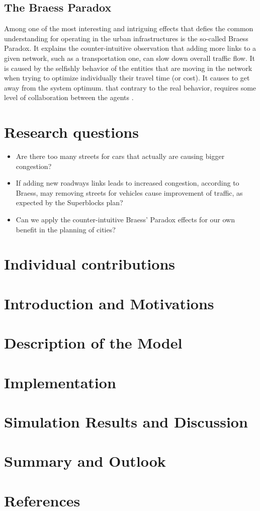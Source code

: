\documentclass[11pt]{article}
\begin{document}
\subsection {The Braess Paradox}

Among one of the most interesting and intriguing effects that defies the common understanding for operating in the urban infrastructures is the so-called Braess Paradox. It explains the counter-intuitive observation that adding more links to a given network, such as a transportation one, can slow down overall traffic flow. It is caused by the selfishly behavior of the entities that are moving in the network when trying to optimize individually their travel time (or cost). It causes to get away from the system optimum. that contrary to the real behavior, requires some level of collaboration between the agents \citep{Braess1969}.

\section {Research questions}

\begin{itemize}
    \item Are there too many streets for cars that actually are causing bigger congestion?
    \item If adding new roadways links leads to increased congestion, according to Braess, may removing streets for vehicles cause improvement of traffic, as expected by the Superblocks plan?
    \item Can we apply the counter-intuitive Braess’ Paradox effects for our own benefit in the planning of cities?
\end{itemize}

\section{Individual contributions}

\section{Introduction and Motivations}

\section{Description of the Model}

\section{Implementation}

\section{Simulation Results and Discussion}

\section{Summary and Outlook}

\section{References}
\end{document}
